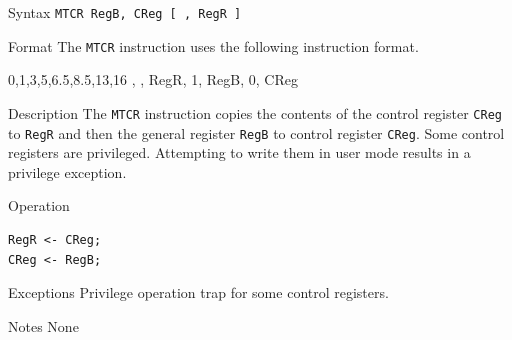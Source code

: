 %
%
\pagebreak
{}

\begin{iPageDescEntry}{Syntax}
\texttt{MTCR RegB, CReg [ , RegR ]}
\end{iPageDescEntry}

\begin{iPageDescEntry}{Format}
The \texttt{MTCR} instruction uses the following instruction format. \\

\begin{flushleft}
\drawInstrFormat
    {0,1,3,5,6.5,8.5,13,16}
    {\OpCodeGrpSYS, \OpCodeMTCR, RegR, 1, RegB, 0, CReg}
\end{flushleft}
\end{iPageDescEntry}

\begin{iPageDescEntry}{Description}
The \texttt{MTCR} instruction copies the contents of the control register \texttt{CReg} to \texttt{RegR} and then the general register \texttt{RegB} to control register \texttt{CReg}.  
Some control registers are privileged. Attempting to write them in user mode results in a privilege exception.
\end{iPageDescEntry}

\begin{iPageDescOpEntry}{Operation}
\begin{lstlisting}[style=iPageOpStyle]
RegR <- CReg;
CReg <- RegB;    
\end{lstlisting}
\end{iPageDescOpEntry}

\begin{iPageDescEntry}{Exceptions}
Privilege operation trap for some control registers.
\end{iPageDescEntry}

\begin{iPageDescEntry}{Notes}
None
\end{iPageDescEntry}

